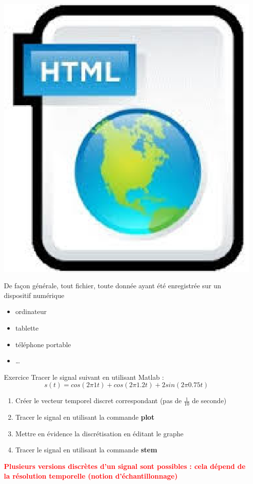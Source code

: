 \documentclass[a4paper,11pt]{beamer}
\newcounter{exampleBlockCounter}
\begin{document}
\begin{frame}
\includegraphics[scale=.15]{images/web.eps}

\pause
\vspace{0.5cm}
\justifying
De façon générale, tout fichier, toute donnée ayant été enregistrée sur un
dispositif numérique
\begin{itemize}
  \item ordinateur
  \item tablette
  \item téléphone portable
  \item \ldots
\end{itemize}
\end{frame}

\begin{frame}
\begin{exampleblock}{Exercice }
Tracer le signal suivant en utilisant Matlab :
$$
s(t) = cos(2\pi1t) + cos(2\pi1.2t) + 2sin(2\pi0.75t)
$$
\begin{enumerate}
  \item Créer le vecteur temporel discret correspondant (pas de $\frac{1}{10}$
  de seconde)
  \item Tracer le signal en utilisant la commande \textbf{plot}
  \item Mettre en évidence la discrétisation en éditant le graphe
  \item Tracer le signal en utilisant la commande \textbf{stem}
\end{enumerate}
\end{exampleblock}
\pause
\centering
\textcolor{red}{\textbf{Plusieurs versions discrètes d'un signal sont possibles
: cela dépend de la résolution temporelle (notion d'échantillonnage)}}
\end{frame}
\end{document}
